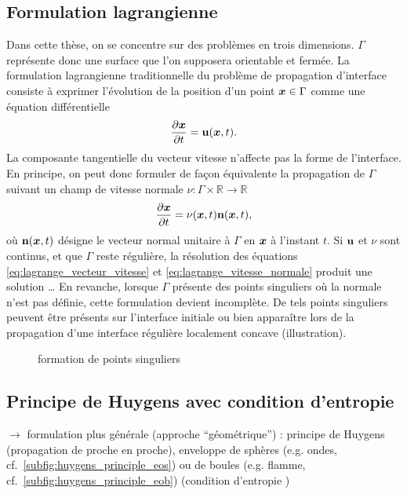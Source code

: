 \subsection{Formulation lagrangienne}
Dans cette thèse, on se concentre sur des problèmes en trois dimensions. $\Gamma$ représente donc une surface que l'on supposera orientable et fermée.
La formulation lagrangienne traditionnelle du problème de propagation d'interface consiste à exprimer l'évolution de la position d'un point $\boldsymbol{x} \in \Gamma$ comme une équation différentielle
\begin{equation}
	\frac{\partial \boldsymbol{x}}{\partial t} = \mathbf{u}(\boldsymbol{x},t).
	\label{eq:lagrange_vecteur_vitesse}
\end{equation}
La composante tangentielle du vecteur vitesse n'affecte pas la forme de l'interface. En principe, on peut donc formuler de façon équivalente la propagation de $\Gamma$ suivant un champ de vitesse normale $\nu : \Gamma \times \mathbb{R} \to \mathbb{R}$
\begin{equation}
	\frac{\partial \boldsymbol{x}}{\partial t} = \nu(\boldsymbol{x},t) \mathbf{n}(\boldsymbol{x},t),
	\label{eq:lagrange_vitesse_normale}
\end{equation}
où $\mathbf{n}(\boldsymbol{x},t)$ désigne le vecteur normal unitaire à $\Gamma$ en $\boldsymbol{x}$ à l'instant $t$.
Si $\mathbf{u}$ et $\nu$ sont continus, et que $\Gamma$ reste régulière, la résolution des équations \eqref{eq:lagrange_vecteur_vitesse} et  \eqref{eq:lagrange_vitesse_normale} produit une solution \ldots
En revanche, lorsque $\Gamma$ présente des points singuliers où la normale n'est pas définie, cette formulation devient incomplète. 
De tels points singuliers peuvent être présents sur l'interface initiale ou bien apparaître lors de la propagation d'une interface régulière localement concave (illustration).
\begin{figure}
\centering

\caption{formation de points singuliers}
\end{figure}
\subsection{Principe de Huygens avec condition d'entropie}
$\to$ formulation plus générale (approche ``géométrique'') : principe de Huygens (propagation de proche en proche), enveloppe de sphères (e.g. ondes, cf.~\autoref{subfig:huygens_principle_eos}) ou de boules (e.g. flamme, cf.~\autoref{subfig:huygens_principle_eob}) (condition d'entropie \cite{sethian1999})

